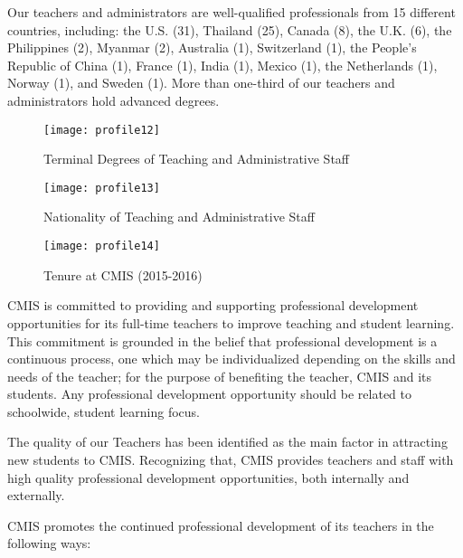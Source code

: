 
Our teachers and administrators are well-qualified professionals from 15 different countries, including:  the U.S. (31), Thailand (25), Canada (8), the U.K. (6), the Philippines (2), Myanmar (2), Australia (1), Switzerland (1), the People’s Republic of China (1), France (1), India (1), Mexico (1), the Netherlands (1), Norway (1), and Sweden (1).  More than one-third of our teachers and administrators hold advanced degrees.

\begin{figure}
\centering
\texttt{[image: profile12]}
\caption{Terminal Degrees of Teaching and Administrative Staff}
\end{figure}

\begin{figure}
\centering
\texttt{[image: profile13]}
\caption{Nationality of Teaching and Administrative Staff}
\end{figure}

\begin{figure}
\centering
\texttt{[image: profile14]}
\caption{Tenure at CMIS (2015-2016)}
\end{figure}


CMIS is committed to providing and supporting professional development opportunities for its full-time teachers to improve teaching and student learning. This commitment is grounded in the belief that professional development is a continuous process, one which may be individualized depending on the skills and needs of the teacher; for the purpose of benefiting the teacher, CMIS and its students.  Any professional development opportunity should be related to schoolwide, student learning focus. 

The quality of our Teachers has been identified as the main factor in attracting new students to CMIS.  Recognizing that, CMIS provides teachers and staff with high quality professional development opportunities, both internally and externally.  

CMIS promotes the continued professional development of its teachers in the following ways:


